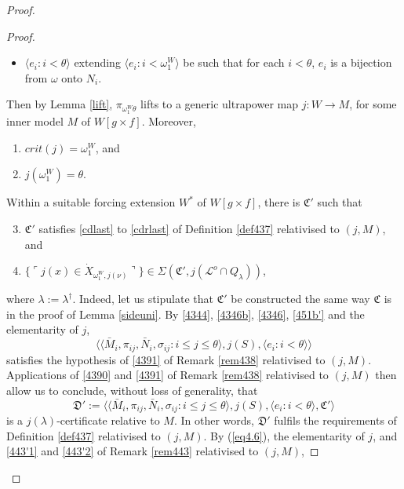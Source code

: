 \documentclass[12pt, twoside]{memoir}
\numberwithin{equation}{section}
\theoremstyle{definition}
\theoremstyle{remark}
\theoremstyle{definition}
\theoremstyle{definition}
\theoremstyle{definition}
\theoremstyle{remark}
\begin{document}
\begin{proof}
\begin{proof}
\begin{itemize}
    \item $\langle e_i : i < \theta \rangle$ extending $\langle e_i : i < \omega_1^W \rangle$ be such that for each $i < \theta$, $e_i$ is a bijection from $\omega$ onto $N_i$.
\end{itemize}
Then by Lemma \ref{lift}, $\pi_{\omega_1^W\theta}$ lifts to a generic ultrapower map $j : W \longrightarrow M$, for some inner model $M$ of $W[g \times f]$. Moreover, 
\begin{enumerate}[label=(\alph*)]
    \item\label{451a'} $crit(j) = \omega_1^W$, and
    \item\label{451b'} $j(\omega_1^W) = \theta$.
\end{enumerate}

Within a suitable forcing extension $W^*$ of $W[g \times f]$, there is $\mathfrak{C}'$ such that 
\begin{enumerate}[label=(\alph*)]
    \setcounter{enumi}{2}
    \item $\mathfrak{C}'$ satisfies \ref{cdlast} to \ref{cdrlast} of Definition \ref{def437} relativised to $(j, M)$, and
    \item $\{\ulcorner j(x) \in \dot{X}_{\omega_1^W, j(\nu)} \urcorner\} \in \Sigma(\mathfrak{C}', j(\mathcal{L}^o \cap Q_{\lambda}))$,
\end{enumerate} 
where $\lambda := \lambda^{\dagger}$. Indeed, let us stipulate that $\mathfrak{C}'$ be constructed the same way $\mathfrak{C}$ is in the proof of Lemma \ref{sideuni}. By \ref{4344}, \ref{4346b}, \ref{4346}, \ref{451b'} and the elementarity of $j$, 
\begin{equation*}
    \langle \langle \bar{M}_i, \pi_{ij}, \bar{N}_i, \sigma_{ij} : i \leq j \leq \theta \rangle, j(S), \langle e_i : i < \theta \rangle \rangle
\end{equation*}
satisfies the hypothesis of \ref{4391} of Remark \ref{rem438} relativised to $(j, M)$. Applications of \ref{4390} and \ref{4391} of Remark \ref{rem438} relativised to $(j, M)$ then allow us to conclude, without loss of generality, that
\begin{equation*}
    \mathfrak{D}' := \langle \langle \bar{M}_i, \pi_{ij}, \bar{N}_i, \sigma_{ij} : i \leq j \leq \theta \rangle, j(S), \langle e_i : i < \theta \rangle, \mathfrak{C}' \rangle
\end{equation*}
is a $j(\lambda)$-certificate relative to $M$. In other words, $\mathfrak{D}'$ fulfils the requirements of Definition \ref{def437} relativised to $(j, M)$. By (\ref{eq4.6}), the elementarity of $j$, and \ref{443'1} and \ref{443'2} of Remark \ref{rem443} relativised to $(j, M)$, 

\end{proof}
\end{proof}
\end{document}
